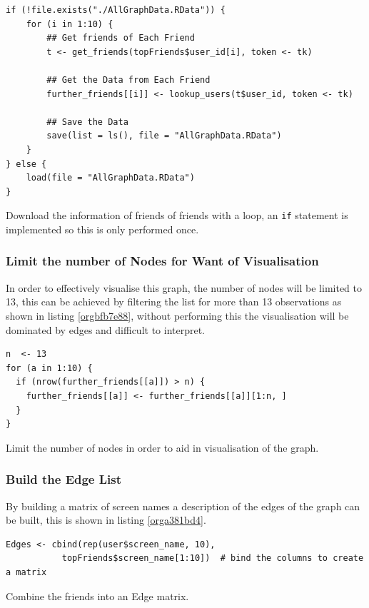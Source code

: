 \documentclass[11pt]{article}
\begin{document}
\begin{listing}[htbp]
\begin{verbatim}
if (!file.exists("./AllGraphData.RData")) {
    for (i in 1:10) {
        ## Get friends of Each Friend
        t <- get_friends(topFriends$user_id[i], token <- tk)

        ## Get the Data from Each Friend
        further_friends[[i]] <- lookup_users(t$user_id, token <- tk)

        ## Save the Data
        save(list = ls(), file = "AllGraphData.RData")
    }
} else {
    load(file = "AllGraphData.RData")
}

\end{verbatim}
\caption{\label{org2f9c438}Download the information of friends of friends with a loop, an \texttt{if} statement is implemented so this is only performed once.}
\end{listing}

\subsubsection{Limit the number of Nodes for Want of Visualisation}
\label{sec:org246fe4b}
In order to effectively visualise this graph, the number of nodes will be limited to 13, this can be achieved by filtering the list for more than 13 observations as shown in listing \ref{orgbfb7e88}, without performing this the visualisation will be dominated by edges and difficult to interpret.

\begin{listing}[htbp]
\begin{verbatim}
n  <- 13
for (a in 1:10) {
  if (nrow(further_friends[[a]]) > n) {
    further_friends[[a]] <- further_friends[[a]][1:n, ]
  }
}
\end{verbatim}
\caption{\label{orgbfb7e88}Limit the number of nodes in order to aid in visualisation of the graph.}
\end{listing}

\subsubsection{Build the Edge List}
\label{sec:org691d4e4}

By building a matrix of screen names a description of the edges of the graph can be built, this is shown in listing \ref{orga381bd4}.

\begin{listing}[htbp]
\begin{verbatim}
Edges <- cbind(rep(user$screen_name, 10),
           topFriends$screen_name[1:10])  # bind the columns to create a matrix

\end{verbatim}
\caption{\label{orga381bd4}Combine the friends into an Edge matrix.}
\end{listing}
\end{document}
